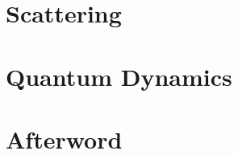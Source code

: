 \documentclass[12pt, a4paper, oneside, openright, titlepage]{book}
\begin{document}
\chapter{Scattering}



\chapter{Quantum Dynamics}



\chapter{Afterword}



\begin{appendices}


\end{appendices}
\end{document}
